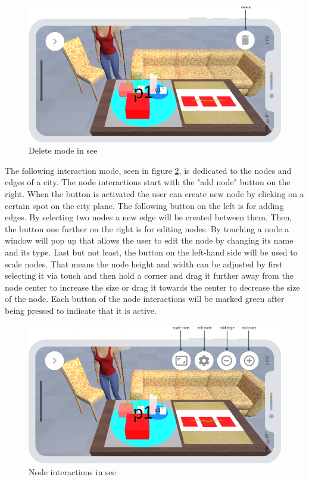 \begin{figure}[htb]
    \centering
    \includegraphics[width=1\textwidth]{Concept/img/menu2.png}
    \caption{Delete mode in \gls{see}}\label{fig:delete}
\end{figure}

The following interaction mode, seen in figure \ref{fig:nodes}, is dedicated to the \glspl{node} and \glspl{edge} of a \gls{city}.
The \gls{node} interactions start with the "add \gls{node}" button on the right.
When the button is activated the user can create new \gls{node} by clicking on a certain spot on the \gls{city} \gls{plane}. 
The following button on the left is for adding \glspl{edge}.
By selecting two \glspl{node} a new \gls{edge} will be created between them. 
Then, the button one further on the right is for editing \glspl{node}.
By touching a \gls{node} a window will pop up that allows the user to edit the \gls{node} by changing its name and its type.
Last but not least, the button on the left-hand side will be used to scale \glspl{node}.
That means the \gls{node} height and width can be adjusted by first selecting it via touch and then hold a corner and drag it further away from the \gls{node} center to increase the size or drag it towards the center to decrease the size of the \gls{node}.
Each button of the \gls{node} interactions will be marked green after being pressed to indicate that it is active.

\begin{figure}[htb]
    \centering
    \includegraphics[width=1\textwidth]{Concept/img/menu3.png}
    \caption{Node interactions in \gls{see}}\label{fig:nodes}
\end{figure}

